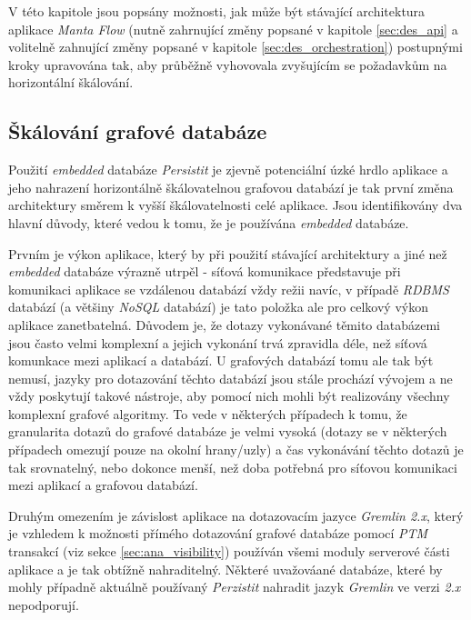 V této kapitole jsou popsány možnosti, jak může být stávající architektura aplikace \textit{Manta Flow} (nutně zahrnující změny popsané v kapitole \ref{sec:des_api} a volitelně zahnující změny popsané v kapitole \ref{sec:des_orchestration}) postupnými kroky upravována tak, aby průběžně vyhovovala zvyšujícím se požadavkům na horizontální škálování.

\subsection{Škálování grafové databáze}
\label{sec:des_scaling_db}
Použití \textit{embedded} databáze \textit{Persistit} je zjevně potenciální úzké hrdlo aplikace a jeho nahrazení horizontálně škálovatelnou grafovou databází je tak první změna architektury směrem k vyšší škálovatelnosti celé aplikace. Jsou identifikovány dva hlavní důvody, které vedou k tomu, že je používána \textit{embedded} databáze.

Prvním je výkon aplikace, který by při použití stávající architektury a jiné než \textit{embedded} databáze výrazně utrpěl - síťová komunikace představuje při komunikaci aplikace se vzdálenou databází vždy režii navíc, v případě \textit{RDBMS} databází (a většiny \textit{NoSQL} databází) je tato položka ale pro celkový výkon aplikace zanetbatelná. Důvodem je, že dotazy vykonávané těmito databázemi jsou často velmi komplexní a jejich vykonání trvá zpravidla déle, než síťová komunkace mezi aplikací a databází. U grafových databází tomu ale tak být nemusí, jazyky pro dotazování těchto databází jsou stále prochází vývojem a ne vždy poskytují takové nástroje, aby pomocí nich mohli být realizovány všechny komplexní grafové algoritmy. To vede v některých případech k tomu, že granularita dotazů do grafové databáze je velmi vysoká (dotazy se v některých případech omezují pouze na okolní hrany/uzly) a čas vykonávání těchto dotazů je tak srovnatelný, nebo dokonce menší, než doba potřebná pro síťovou komunikaci mezi aplikací a grafovou databází.

Druhým omezením je závislost aplikace na dotazovacím jazyce \textit{Gremlin 2.x}, který je vzhledem k možnosti přímého dotazování grafové databáze pomocí \textit{PTM} transakcí (viz sekce \ref{sec:ana_visibility}) používán všemi moduly serverové části aplikace a je tak obtížně nahraditelný. Některé uvažováané databáze, které by mohly případně aktuálně používaný \textit{Perzistit} nahradit jazyk \textit{Gremlin} ve verzi \textit{2.x} nepodporují.

